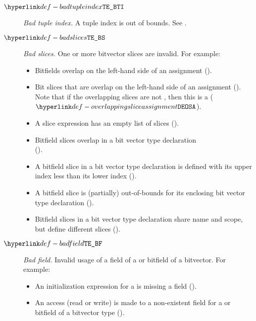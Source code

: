 \begin{description}
\hypertarget{def-badtupleindex}{}
\item[$\BadTupleIndex$]
  \textit{Bad tuple index.}
  A tuple index is out of bounds.
  See .

\hypertarget{def-badslices}{}
\item[$\BadSlices$]
  \textit{Bad slices.}
  One or more bitvector slices are invalid.
  For example:
  \begin{itemize}
    \item Bitfields overlap on the left-hand side of an assignment ().
    \item Bit slices that are \symbolicallyevaluable{} overlap on the left-hand side of an assignment ().
      Note that if the overlapping slices are not \symbolicallyevaluable{}, then this is a \dynamicerrorterm{} ($\OverlappingSliceAssignment$).
    \item A slice expression has an empty list of slices ().
    \item Bitfield slices overlap in a bit vector type declaration \\
      ().
    \item A bitfield slice in a bit vector type declaration is defined with its upper index less than its lower index ().
    \item A bitfield slice is (partially) out-of-bounds for its enclosing bit vector type declaration ().
    \item Bitfield slices in a bit vector type declaration share name and scope, but define different slices ().
  \end{itemize}

\hypertarget{def-badfield}{}
\item[$\BadField$]
  \textit{Bad field.}
  Invalid usage of a field of a \structuredtype{} or bitfield of a bitvector.
  For example:
  \begin{itemize}
    \item An initialization expression for a \structuredtype{} is missing a field ().
    \item An access (read or write) is made to a non-existent field for a \structuredtype{} or bitfield of a bitvector type ().
  \end{itemize}


\end{description}
